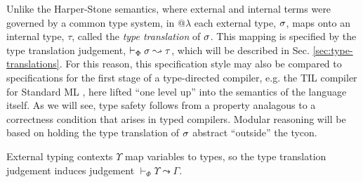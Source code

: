 \documentclass[10pt,preprint]{sigplanconf}
\begin{document}
Unlike the Harper-Stone semantics, where external and internal terms were governed by a common type system, in @$\lambda$ each external type, $\sigma$, maps onto an internal type, $\tau$, called the \emph{type translation} of $\sigma$. This mapping is specified by the  type translation judgement, $\vdash_\Phi \sigma \leadsto \tau$, which will be described in Sec. \ref{sec:type-translations}. 
For this reason, this specification style may also be compared to specifications for the first stage of a type-directed compiler, e.g. the TIL compiler for Standard ML \cite{tarditi+:til-OLD}, here lifted ``one level up'' into the semantics of the language itself. As we will see, type safety follows from a property analagous to a correctness condition that arises in typed compilers. Modular reasoning will be based on holding the type translation of $\sigma$ abstract ``outside'' the tycon.

 External typing contexts $\Upsilon$ map variables to types, so the type translation  judgement induces judgement  $\vdash_\Phi \Upsilon \leadsto \Gamma$.
\end{document}
